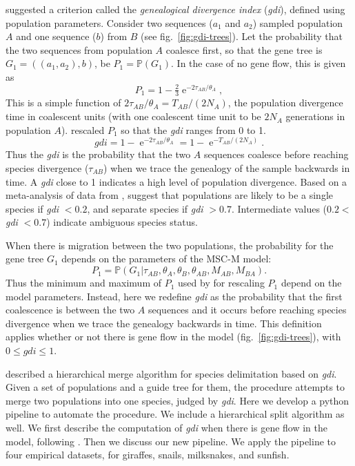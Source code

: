 \documentclass[A4]{article1}
\renewcommand{\P}{\mathbb{P}}
\DeclareMathOperator{\e}{\mathrm{e}}
\begin{document}
\citet{Jackson2017} suggested a criterion called the \textit{genealogical divergence
   index} (\textit{gdi}), defined using population parameters.  Consider two sequences
($a_1$ and $a_2$) sampled population $A$ and one sequence ($b$) from $B$ (see
fig.~\ref{fig:gdi-trees}).  Let the probability that the two sequences from population $A$
coalesce first, so that the gene tree is $G_1 = ((a_1, a_2), b)$, be $P_1 = \P(G_1)$. 
In the case of no gene flow, this is given as
\begin{equation} \label{eq:PG1_M0}
   P_1 = 1 - \tfrac{2}{3} \e^{-2 \tau_{AB} / \theta_A},
\end{equation} 
This is a simple function of $2\tau_{AB}/\theta_A = T_{AB}/(2N_A)$, the population
divergence time in coalescent units (with one coalescent time unit to be $2N_A$
generations in population $A$).  \citet{Jackson2017} rescaled $P_1$ so that the
\textit{gdi} ranges from 0 to 1.
\begin{equation} \label{eq:gdi}
    gdi = 1 - \e^{-2\tau_{AB} / \theta_A} = 1 - \e^{-T_{AB} / (2N_A)}.
\end{equation} 
Thus the \textit{gdi} is the probability that the two $A$ sequences coalesce before
reaching species divergence ($\tau_{AB}$) when we trace the genealogy of the sample
backwards in time. A \textit{gdi} close to 1 indicates a high level of population
divergence.  Based on a meta-analysis of data from \citet{Pinho2010}, \citet{Jackson2017}
suggest that populations are likely to be a single species if \textit{gdi} $< 0.2$, and
separate species if \textit{gdi} $> 0.7$. Intermediate values ($0.2 < $ \textit{gdi} $ <
0.7$) indicate ambiguous species status.

When there is migration between the two populations, the probability for the gene tree
$G_1$ depends on the parameters of the MSC-M model:
\begin{equation} \label{eq:PG1}
    P_1 = \P(G_1 \bigl| \tau_{AB}, \theta_A, \theta_B, \theta_{AB}, M_{AB}, M_{BA}). 
\end{equation} 
Thus the minimum and maximum of $P_1$ used by \citet{Jackson2017} for rescaling $P_1$
depend on the model parameters.  Instead, here we redefine \textit{gdi} as the
probability that the first coalescence is between the two $A$ sequences and it occurs
before reaching species divergence when we trace the genealogy backwards in time.  This
definition applies whether or not there is gene flow in the model (fig.~\ref{fig:gdi-trees}),
with $0 \le gdi \le 1$.

\citet{Leache2019} described a hierarchical merge algorithm for species delimitation
based on \textit{gdi}.  Given a set of populations and a guide tree for them, the
procedure attempts to merge two populations into one species, judged by \textit{gdi}.
Here we develop a python pipeline to automate the procedure.  We include a hierarchical
split algorithm as well.  We first describe the computation of \textit{gdi} when there
is gene flow in the model, following \citet{Leache2019}.  Then we discuss our new
pipeline.  We apply the pipeline to four empirical datasets, for giraffes, snails,
milksnakes, and sunfish.
\end{document}
